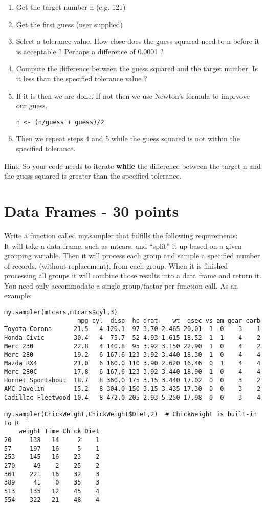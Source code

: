 \documentclass{article}
\begin{document}
\begin{enumerate}
\item Get the target number n (e.g. 121)
\item Get the first guess (user supplied)
\item Select a tolerance value. How close does the guess squared need to n  before it is acceptable ? Perhaps a difference of 0.0001 ? 
\item Compute the difference between the guess squared and the target number. Is it less than the specified tolerance value ?
\item If it is then we are done. If not then we use Newton's formula to imprvove our guess. \begin{verbatim}n <- (n/guess + guess)/2 \end{verbatim}
\item Then we repeat steps 4 and 5 while the guess squared is not within the specified tolerance.
\end{enumerate}
Hint: So your code needs to iterate \textbf{while} the difference between the target n and the guess squared is greater than the specified tolerance. 

\section{Data Frames - 30 points}Write a function called my.sampler that fulfills the following requirements:
\\
It will take a data frame, such as mtcars, and ``split'' it up based on a given grouping variable. Then it will process each group and sample a specified number of records, (without replacement), from each group. When it is finished processing all groups it will combine those results into a data frame and return it. You need only accommodate a single group/factor per function call. As an example:

\begin{verbatim}
my.sampler(mtcars,mtcars$cyl,3)
                    mpg cyl  disp  hp drat    wt  qsec vs am gear carb
Toyota Corona      21.5   4 120.1  97 3.70 2.465 20.01  1  0    3    1
Honda Civic        30.4   4  75.7  52 4.93 1.615 18.52  1  1    4    2
Merc 230           22.8   4 140.8  95 3.92 3.150 22.90  1  0    4    2
Merc 280           19.2   6 167.6 123 3.92 3.440 18.30  1  0    4    4
Mazda RX4          21.0   6 160.0 110 3.90 2.620 16.46  0  1    4    4
Merc 280C          17.8   6 167.6 123 3.92 3.440 18.90  1  0    4    4
Hornet Sportabout  18.7   8 360.0 175 3.15 3.440 17.02  0  0    3    2
AMC Javelin        15.2   8 304.0 150 3.15 3.435 17.30  0  0    3    2
Cadillac Fleetwood 10.4   8 472.0 205 2.93 5.250 17.98  0  0    3    4

my.sampler(ChickWeight,ChickWeight$Diet,2)  # ChickWeight is built-in to R
    weight Time Chick Diet
20     138   14     2    1
57     197   16     5    1
253    145   16    23    2
270     49    2    25    2
361    221   16    32    3
389     41    0    35    3
513    135   12    45    4
554    322   21    48    4
\end{verbatim}
\end{document}
